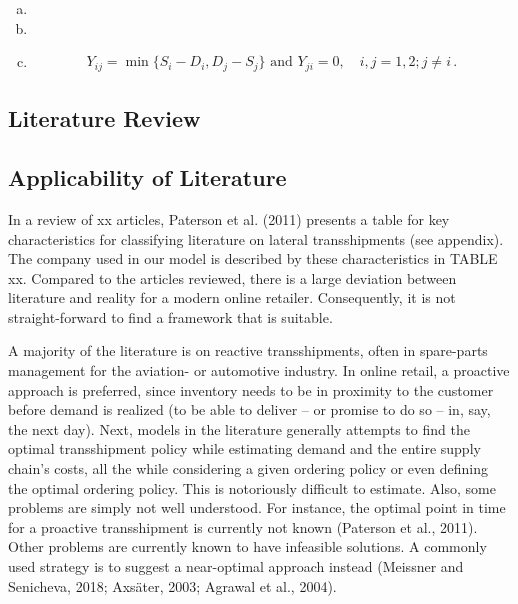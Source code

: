 \documentclass[../../main.tex]{subfiles}
\begin{document}
% 
\begin{enumerate}[a)]
    \item
    \item
    \item
    \begin{align*}
        \text{$Y_{ij} = \min\{S_i - D_i,D_j-S_j\}$ and $Y_{ji} = 0,\quad i,j = 1,2; j \neq i\,$.}
    \end{align*}
\end{enumerate}

\subsection{Literature Review}

\subsection{Applicability of Literature}

In a review of xx articles, Paterson et al. (2011) presents a table for key characteristics for classifying literature on lateral transshipments (see appendix). The company used in our model is described by these characteristics in TABLE xx. Compared to the articles reviewed, there is a large deviation between literature and reality for a modern online retailer. Consequently, it is not straight-forward to find a framework that is suitable.

A majority of the literature is on reactive transshipments, often in spare-parts management for the aviation- or automotive industry. In online retail, a proactive approach is preferred, since inventory needs to be in proximity to the customer before demand is realized (to be able to deliver – or promise to do so – in, say, the next day). Next, models in the literature generally attempts to find the optimal transshipment policy while estimating demand and the entire supply chain's costs, all the while considering a given ordering policy or even defining the optimal ordering policy. This is notoriously difficult to estimate. Also, some problems are simply not well understood. For instance, the optimal point in time for a proactive transshipment is currently not known (Paterson et al., 2011). Other problems are currently known to have infeasible solutions. A commonly used strategy is to suggest a near-optimal approach instead (Meissner and Senicheva, 2018; Axsäter, 2003; Agrawal et al., 2004).
\end{document}
